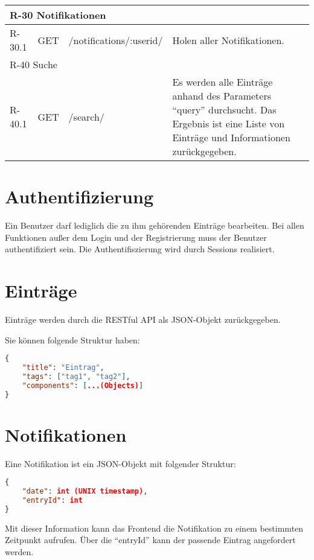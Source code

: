 \begin{tabularx}{\textwidth}{|l|l|l|X|}
    \hline
    \multicolumn{4}{|l|}{R-30 Notifikationen}\\
    \hline
    R-30.1 & GET & /notifications/:userid/ & Holen aller Notifikationen.\\ 

    \hline
    \multicolumn{4}{|l|}{R-40 Suche}\\
    \hline
    R-40.1 & GET & /search/ & Es werden alle Einträge anhand des Parameters \enquote{query} durchsucht.
                                Das Ergebnis ist eine Liste von Einträge und Informationen zurückgegeben.\\

\end{tabularx}

\section{Authentifizierung}
Ein Benutzer darf lediglich die zu ihm gehörenden Einträge bearbeiten. 
Bei allen Funktionen außer dem Login und der Registrierung muss der Benutzer authentifiziert sein.
Die Authentifiszierung wird durch Sessions realisiert.

\section{Einträge}
Einträge werden durch die RESTful API als JSON-Objekt zurückgegeben.

Sie können folgende Struktur haben:

\begin{lstlisting}[language=JSON]
{
    "title": "Eintrag",
    "tags": ["tag1", "tag2"],
    "components": [...(Objects)]
}
\end{lstlisting}

\section{Notifikationen}
Eine Notifikation ist ein JSON-Objekt mit folgender Struktur:

\begin{lstlisting}[language=JSON]
{
    "date": int (UNIX timestamp),
    "entryId": int
}
\end{lstlisting}

Mit dieser Information kann das Frontend die Notifikation zu einem bestimmten Zeitpunkt aufrufen. Über die \enquote{entryId} kann der passende Eintrag angefordert werden.

